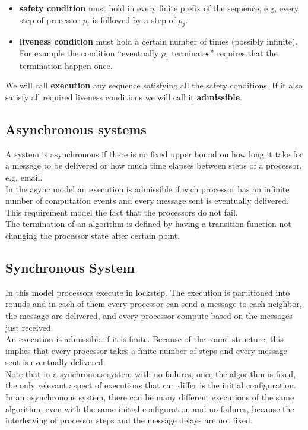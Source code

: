 \documentclass{article}
\begin{document}
\begin{itemize}
\item \textbf{safety condition} must hold in every finite prefix of the sequence, e.g, every step of processor $p_i$ is followed by a step of $p_j$. 
\item \textbf{liveness condition} must hold a certain number of times (possibly infinite). For example the condition ``eventually $p_1$ terminates'' requires that the termination happen once.
\end{itemize}
We will call \textbf{execution} any sequence satisfying all the safety conditions. If it also satisfy all required liveness conditions we will call it \textbf{admissible}.

\subsection{Asynchronous systems}
A system is asynchronous if there is no fixed upper bound on how long it take for a messege to be delivered or how much time elapses between steps of a processor, e.g, email.\\

In the async model an execution is admissible if each processor has an infinite number of computation events and every message sent is eventually delivered. This requirement model the fact that the processors do not fail.\\
The termination of an algorithm is defined by having a transition function not changing the processor state after certain point.

\subsection{Synchronous System}
In this model processors execute in lockstep. The execution is partitioned into rounds and in each of them every processor can send a message to each neighbor, the message are delivered, and every processor compute based on the messages just received.\\
An execution is admissible if it is finite. Because of the round structure, this implies that every processor takes a finite number of steps and every message sent is eventually delivered.\\

Note that in a synchronous system with no failures, once the algorithm is fixed, 
the only relevant aspect of executions that can differ is the initial configuration. In an 
asynchronous system, there can be many different executions of the same algorithm, 
even with the same initial configuration and no failures, because the interleaving of 
processor steps and the message delays are not fixed. 
\end{document}
